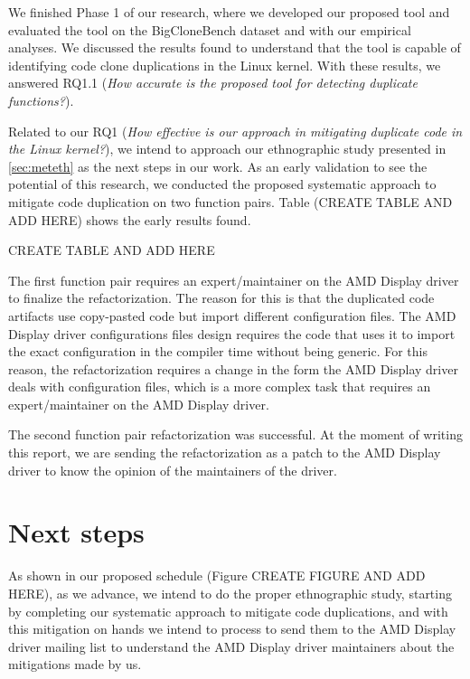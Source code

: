 \en

We finished Phase 1 of our research, where we developed our proposed tool and 
evaluated the tool on the BigCloneBench dataset and with our empirical analyses. 
We discussed the results found to understand that the tool is capable of identifying 
code clone duplications in the Linux kernel. With these results, we answered RQ1.1 
(\textit{How accurate is the proposed tool for detecting duplicate functions?}).

Related to our RQ1
(\textit{How effective is our approach in mitigating duplicate code in the Linux kernel?}),
we intend to approach our ethnographic study presented in \ref{sec:meteth} as the next steps 
in our work. As an early validation to see the potential of this research, we conducted the 
proposed systematic approach to mitigate code duplication on two function pairs. Table
(CREATE TABLE AND ADD HERE) shows the early results found.

CREATE TABLE AND ADD HERE

The first function pair requires an expert/maintainer on the AMD Display driver to finalize 
the refactorization. The reason for this is that the duplicated code artifacts use 
copy-pasted code but import different configuration files. The AMD Display driver 
configurations files design requires the code that uses it to import the exact configuration 
in the compiler time without being generic. For this reason, the refactorization requires 
a change in the form the AMD Display driver deals with configuration files, which is a more 
complex task that requires an expert/maintainer on the AMD Display driver.

The second function pair refactorization was successful. At the moment of writing this 
report, we are sending the refactorization as a patch to the AMD Display driver to know 
the opinion of the maintainers of the driver.

\section{Next steps}

As shown in our proposed schedule (Figure CREATE FIGURE AND ADD HERE), as we advance, 
we intend to do the proper ethnographic study, starting by completing our systematic 
approach to mitigate code duplications, and with this mitigation on hands we intend 
to process to send them to the AMD Display driver mailing list to understand the 
AMD Display driver maintainers about the mitigations made by us.
